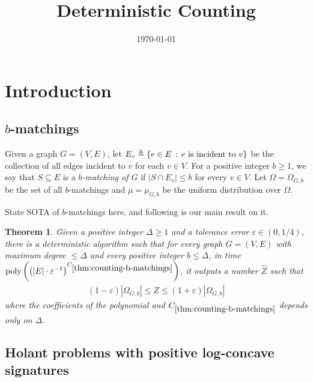 \documentclass[11pt]{article}
\title{Deterministic Counting}
\author{}
\date{\today}
\newtheorem{theorem}{Theorem}
\newcommand{\abs}[1]{\left\vert#1\right\vert}
\newcommand{\set}[1]{\left\{#1\right\}}
\newcommand{\defeq}{\triangleq} \renewcommand{\d}{\,\-d}
\def\poly{\mathrm{poly}}
\newcommand{\wh}[1]{\widehat{#1}}
\newcommand{\qtodo}[1]{\todo[color = purple!40, size = \tiny]{\textbf{guoliang:} #1}}
\newcommand{\qgl}[1]{{\color{purple}{#1}}}
\newcommand{\zdnew}[1]{{\color{cyan} #1}}
\begin{document}
\maketitle

\section{Introduction}

\subsection{$b$-matchings}

Given a graph $G = (V, E)$, let $E_v \defeq \set{e \in E \cmid \mbox{$e$ is incident to $v$}}$ be the collection of all edges incident to $v$ for each $v \in V$. For a positive integer $b \ge 1$, we say that $S \subseteq E$ is a \emph{$b$-matching of $G$} if $\abs{S \cap E_v} \le b$ for every $v \in V$. Let $\Omega = \Omega_{G, b}$ be the set of all $b$-matchings and $\mu = \mu_{G, b}$ be the uniform distribution over $\Omega$. 

\zdnew{State SOTA of $b$-matchings here, and following is our main result on it.}

\begin{theorem} \label{thm:counting-b-matchings}
    Given a positive integer $\Delta \ge 1$ and a tolerance error $\varepsilon \in (0, 1/4)$, there is a deterministic algorithm such that for every graph $G = (V, E)$ with maximum degree $\le \Delta$ and every positive integer $b \le \Delta$, in time $\poly\left(\left(\abs{E} \cdot \varepsilon^{-1}\right)^{C_{\ref{thm:counting-b-matchings}}}\right)$, it outputs a number $\wh{Z}$ such that
    \begin{align*}
        (1 - \varepsilon) \abs{\Omega_{G, b}} \le \wh{Z} \le (1 + \varepsilon) \abs{\Omega_{G, b}}
    \end{align*}
    where the coefficients of the polynomial and $C_{\ref{thm:counting-b-matchings}}$ depends only on $\Delta$.
\end{theorem}

\subsection{Holant problems with positive log-concave signatures}
\end{document}

